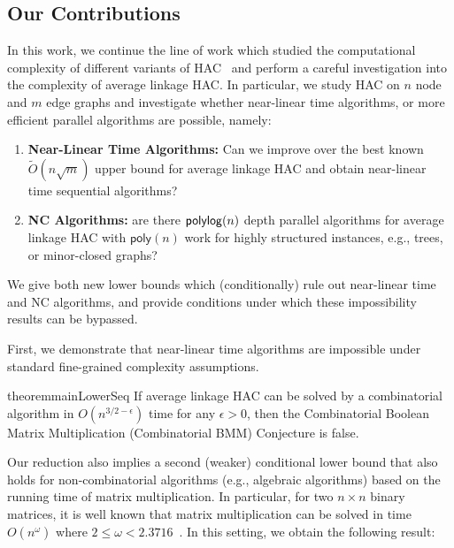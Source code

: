 \documentclass[11pt]{article}
\newcommand{\NC}{\textsc{NC}\xspace}
\newcommand{\poly}{\ensuremath{\mathsf{poly}}}
\newcommand{\polylog}{{\ensuremath\mathsf{polylog}}}
\begin{document}
\subsection{Our Contributions}
In this work, we continue the line of work which studied the computational complexity of different variants of HAC~\cite{greenlaw2008parallel, tsenghac, abboudhac, dhulipala2021hierarchical, dhulipala2022hierarchical} and perform a careful investigation into the complexity of average linkage HAC.
In particular, we study HAC on $n$ node and $m$ edge graphs and investigate whether
near-linear time algorithms, or more efficient parallel algorithms are possible, namely:
\begin{enumerate}
    \item \textbf{Near-Linear Time Algorithms:} Can we improve over the best known $\tilde{O}(n\sqrt{m})$ upper bound for average linkage HAC and obtain near-linear time sequential algorithms?
    
    \item \textbf{\NC Algorithms:} are there $\polylog(n)$ depth parallel algorithms for average linkage HAC with $\poly(n)$ work for highly structured instances, e.g., trees, or minor-closed graphs?
\end{enumerate}
We give both new lower bounds which (conditionally) rule out near-linear time and \NC algorithms, and provide conditions under which these impossibility results can be bypassed.

First, we demonstrate that near-linear time algorithms are impossible under standard fine-grained complexity assumptions. 

\begin{restatable}{theorem}{mainLowerSeq}\label{thm:worklb}
    If average linkage HAC can be solved by a combinatorial algorithm in $O(n^{3/2-\epsilon})$ time for any $\epsilon > 0$, then the Combinatorial Boolean Matrix Multiplication (Combinatorial BMM) Conjecture is false.
\end{restatable}


Our reduction also implies a second (weaker) conditional lower bound that also holds for non-combinatorial algorithms (e.g., algebraic algorithms) based on the running time of matrix multiplication. 
In particular, for two $n \times n$ binary matrices, it is well known that matrix multiplication can be solved in time $O(n^{\omega})$ where $2 \leq \omega < 2.3716$~\cite{williams2024new}.
In this setting, we obtain the following result:
\end{document}

